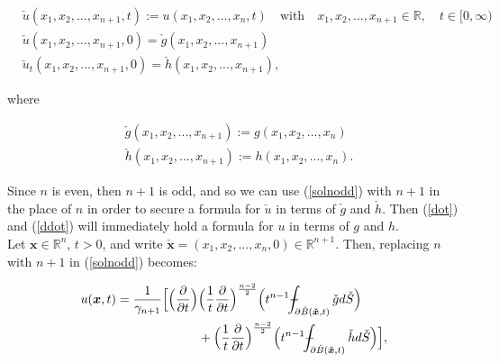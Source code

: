 \documentclass[a4paper, 12pt]{article}
\def\Xint#1{\mathchoice
{\XXint\displaystyle\textstyle{#1}}%
{\XXint\textstyle\scriptstyle{#1}}%
{\XXint\scriptstyle\scriptscriptstyle{#1}}%
{\XXint\scriptscriptstyle\scriptscriptstyle{#1}}%
\!\int}
\def\XXint#1#2#3{{\setbox0=\hbox{$#1{#2#3}{\int}$ }
\vcenter{\hbox{$#2#3$ }}\kern-.6\wd0}}
\def\dashint{\Xint-}
\numberwithin{equation}{section}
\begin{document}
\begin{equation} \label{dot}
    \begin{aligned}
        &\check{u}(x_1, x_2, ..., x_{n+1}, t):=u(x_1, x_2, ..., x_n, t) \quad \textrm{with} \quad x_1, x_2, ..., x_{n+1} \in \mathbb{R}, \quad t \in [0, \infty)\\
        &\check{u}(x_1, x_2, ..., x_{n+1}, 0)=\check{g}(x_1, x_2, ..., x_{n+1})\\
        &\check{u}_t(x_1, x_2, ..., x_{n+1}, 0)=\check{h}(x_1, x_2, ..., x_{n+1}),
    \end{aligned}
\end{equation}

where 

\begin{equation} \label{ddot}
    \begin{aligned}
        &\check{g}(x_1, x_2, ..., x_{n+1}):=g(x_1, x_2, ..., x_n)\\
        &\check{h}(x_1, x_2, ..., x_{n+1}):=h(x_1, x_2, ..., x_n).
    \end{aligned}
\end{equation}

Since $n$ is even, then $n+1$ is odd, and so we can use (\ref{solnodd}) with
$n+1$ in the place of $n$ in order to secure a formula for $\check{u}$ in terms
of $\check{g}$ and $\check{h}$. Then (\ref{dot}) and (\ref{ddot}) will
immediately hold a formula for $u$ in terms of $g$ and $h$. \\

Let $\boldsymbol{x} \in \mathbb{R}^n$, $t>0$, and write
$\check{\boldsymbol{x}}=(x_1, x_2, ..., x_n, 0) \in \mathbb{R}^{n+1}$. Then,
replacing $n$ with $n+1$ in (\ref{solnodd}) becomes:

\begin{equation} \label{solneven}
    \begin{split}
        u(\boldsymbol{x}, t)=\frac{1}{\gamma_{n+1}}\Big[\Big(\diffp[1]{}{t}\Big) & \Big(\frac{1}{t} \diffp[1]{}{t} \Big)^{\frac{n-2}{2}}\Big(t^{n-1} \dashint_{\partial \check{B}(\boldsymbol{\check{x}},t)}\check{g}d\check{S} \Big)\\
        &+ \Big(\frac{1}{t} \diffp[1]{}{t} \Big)^{\frac{n-2}{2}}\Big(t^{n-1} \dashint_{\partial \check{B}(\boldsymbol{\check{x}},t)}\check{h}d\check{S} \Big)\Big],
    \end{split}
\end{equation} 
\end{document}
